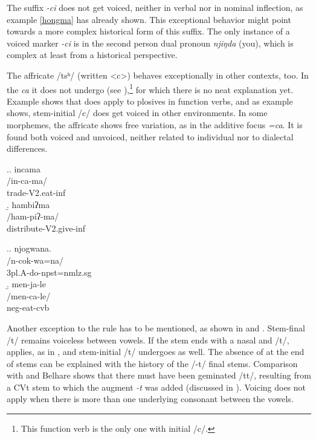 The suffix \emph{-ci} does not get voiced, neither in verbal nor in nominal inflection, as example \ref{hongma} has already shown. This exceptional behavior might point towards a more complex historical form of this suffix. The only instance of a voiced marker \emph{-ci} is in the second person dual pronoun \emph{njiŋda} (you), which is complex at least from a historical perspective. 

The affricate /tsʰ/ (written <c>) behaves exceptionally in other contexts, too. In the  \emph{ca}  it does not undergo  (see \Next[a]),\footnote{This function verb is the only one with initial /c/.} for which there is no neat explanation yet. Example \Next[b] shows that  does apply to plosives in function verbs, and as example \NNext shows, stem-initial /c/ does get voiced in other environments. In some morphemes, the affricate shows free variation, as in the additive focus  \emph{=ca}. It is found both voiced and unvoiced, neither related to individual nor to dialectal differences. 
\largerpage
 
 \ex.\a. \glll incama\\
 /in-ca-ma/\\
 trade{\sc -V2.eat-inf}\\
 \b. \glll  hambiʔma\\
 /ham-piʔ-ma/\\
 distribute{\sc -V2.give-inf}\\
 
 
 \ex.\a. \glll njogwana.\\
 /n-cok-wa=na/\\
 {\sc 3pl.A-}do{\sc -npst=nmlz.sg}\\
 \b. \glll men-ja-le\\
 /men-ca-le/\\
 {\sc neg-}eat{\sc -cvb}\\
 

Another exception to the  rule has to be mentioned, as shown in \Next[a] and \Next[b]. Stem-final /t/ remains voiceless between vowels. If the stem ends with a nasal and /t/,  applies, as in \Next[c], and stem-initial /t/ undergoes  as well. The absence of  at the end of stems can be explained with the history of the  /-t/ final stems. Comparison with  and Belhare \citep{Bickel2003Belhare, Bickeletal2007Free} shows that there must have been geminated /tt/, resulting from a CVt stem to which the augment \emph{-t} was added (discussed in ). Voicing does not apply when there is more than one underlying consonant between the vowels. 
			
